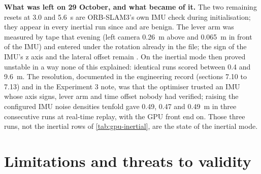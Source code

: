 \documentclass[11pt,a4paper,notitlepage]{report}
\begin{document}
\textbf{What was left on 29 October, and what became of it.} The two remaining
resets at \SI{3.0}{} and \SI{5.6}{\second} are ORB-SLAM3's own IMU check during
initialisation; they appear in every inertial run since and are benign. The lever
arm was measured by tape that evening (left camera \SI{0.26}{\metre} above and
\SI{0.065}{\metre} in front of the IMU) and entered under the rotation already in
the file; the sign of the IMU's z axis and the lateral offset remain
. On  the inertial mode then proved
unstable in a way none of this explained: identical runs scored between
\SI{0.4}{} and \SI{9.6}{\metre}. The resolution, documented in the engineering
record (sections 7.10 to 7.13) and in the Experiment 3 note, was that the
optimiser trusted an IMU whose axis signs, lever arm and time offset nobody had
verified; raising the configured IMU noise densities tenfold gave
\SI{0.49}{}, \SI{0.47}{} and \SI{0.49}{\metre} in three consecutive runs at
real-time replay, with the GPU front end on. Those three runs, not the
inertial rows of \cref{tab:gpu-inertial}, are the state of the inertial mode.


\section{Limitations and threats to validity}
\label{sec:gpu-threats}
\end{document}
